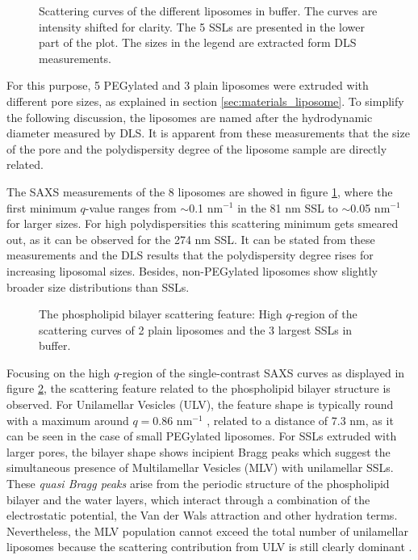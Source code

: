\begin{figure}
	\centering
		
		\caption[Scattering curves of the liposomes in buffer.]{Scattering curves of the different liposomes in buffer. The curves are intensity shifted for clarity. The 5 SSLs are presented in the lower part of the plot. The sizes in the legend are extracted form DLS measurements.}
		\label{fig:SSLSingleContrast}
\end{figure}

For this purpose, 5 PEGylated and 3 plain liposomes were extruded with different pore sizes, as explained in section \ref{sec:materials_liposome}. To simplify the following discussion, the liposomes are named after the hydrodynamic diameter measured by DLS. It is apparent from these measurements that the size of the pore and the polydispersity degree of the liposome sample are directly related.

The SAXS measurements of the 8 liposomes are showed in figure \ref{fig:SSLSingleContrast}, where the first minimum  $q$-value ranges from $\sim$0.1 nm$^{-1}$ in the 81 nm SSL to $\sim$0.05 nm$^{-1}$ for larger sizes. For high polydispersities this scattering minimum gets smeared out, as it can be observed for the 274 nm SSL. It can be stated from these measurements and the DLS results that the polydispersity degree rises for increasing liposomal sizes. Besides, non-PEGylated liposomes show slightly broader size distributions than SSLs.

\begin{figure}
	\centering
		
		\caption[The phospholipid bilayer scattering feature.]{The phospholipid bilayer scattering feature: High $q$-region of the scattering curves of 2 plain liposomes and the 3 largest SSLs in buffer.}
		\label{fig:SSLSingleContrastBilayer}
\end{figure}

Focusing on the high $q$-region of the single-contrast SAXS curves as displayed in figure \ref{fig:SSLSingleContrastBilayer}, the scattering feature related to the phospholipid bilayer structure is observed. For Unilamellar Vesicles (ULV), the feature shape is typically round with a maximum around $q=0.86$ nm$^{-1}$ \citep{varga_characterization_2012}, related to a distance of 7.3 nm, as it can be seen in the case of small PEGylated liposomes. For SSLs extruded with larger pores, the bilayer shape shows incipient Bragg peaks which suggest the simultaneous presence of Multilamellar Vesicles (MLV) with unilamellar SSLs.  These \emph{quasi Bragg peaks} arise from the periodic structure of the phospholipid bilayer and the water layers, which interact through a combination of the electrostatic potential, the Van der Wals attraction and other hydration terms. Nevertheless, the MLV population cannot exceed the total number of unilamellar liposomes because the scattering contribution from ULV is still clearly dominant \citep{sakuragi_transformation_2011}.

